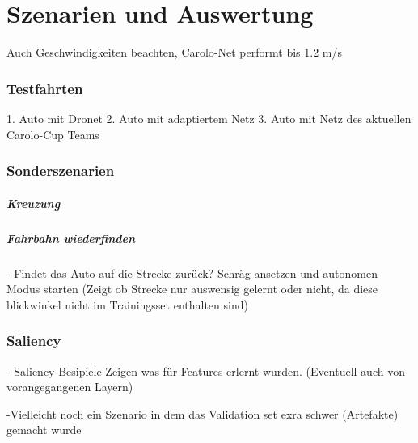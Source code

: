 %
\chapter{Szenarien und Auswertung}

Auch Geschwindigkeiten beachten, Carolo-Net performt bis 1.2 m/s
\subsection{Testfahrten}

1. Auto mit Dronet 
2. Auto mit adaptiertem Netz
3. Auto mit Netz des aktuellen Carolo-Cup Teams 

\subsection{Sonderszenarien}

\paragraph{Kreuzung}

\paragraph{Fahrbahn wiederfinden}




- Findet das Auto auf die Strecke zurück? Schräg ansetzen und autonomen Modus starten
(Zeigt ob Strecke nur auswensig gelernt oder nicht, da  diese blickwinkel nicht im Trainingsset enthalten sind)

\subsection{Saliency}
- Saliency Besipiele Zeigen was für Features erlernt wurden. (Eventuell auch von vorangegangenen Layern)

-Vielleicht noch ein Szenario in dem das Validation set exra schwer (Artefakte) gemacht wurde